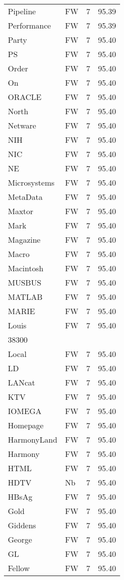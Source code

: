 \documentclass[twocolumn]{book}
\begin{document}
\begin{supertabular}{llrr}
Pipeline & FW & 7 &  95.39\\
Performance & FW & 7 &  95.39\\
Party & FW & 7 &  95.40\\
PS & FW & 7 &  95.40\\
Order & FW & 7 &  95.40\\
On & FW & 7 &  95.40\\
ORACLE & FW & 7 &  95.40\\
North & FW & 7 &  95.40\\
Netware & FW & 7 &  95.40\\
NIH & FW & 7 &  95.40\\
NIC & FW & 7 &  95.40\\
NE & FW & 7 &  95.40\\
Microsystems & FW & 7 &  95.40\\
MetaData & FW & 7 &  95.40\\
Maxtor & FW & 7 &  95.40\\
Mark & FW & 7 &  95.40\\
Magazine & FW & 7 &  95.40\\
Macro & FW & 7 &  95.40\\
Macintosh & FW & 7 &  95.40\\
MUSBUS & FW & 7 &  95.40\\
MATLAB & FW & 7 &  95.40\\
MARIE & FW & 7 &  95.40\\
Louis & FW & 7 &  95.40\\
38300\\
Local & FW & 7 &  95.40\\
LD & FW & 7 &  95.40\\
LANcat & FW & 7 &  95.40\\
KTV & FW & 7 &  95.40\\
IOMEGA & FW & 7 &  95.40\\
Homepage & FW & 7 &  95.40\\
HarmonyLand & FW & 7 &  95.40\\
Harmony & FW & 7 &  95.40\\
HTML & FW & 7 &  95.40\\
HDTV & Nb & 7 &  95.40\\
HBsAg & FW & 7 &  95.40\\
Gold & FW & 7 &  95.40\\
Giddens & FW & 7 &  95.40\\
George & FW & 7 &  95.40\\
GL & FW & 7 &  95.40\\
Fellow & FW & 7 &  95.40\\

\end{supertabular}
\end{document}
